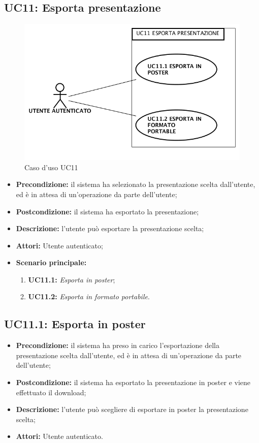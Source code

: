 \subsection{ UC11: Esporta presentazione}

\begin{figure}[h]
	\begin{center}
	\includegraphics[scale=0.4]{diagram/UC11.png}
	\caption{Caso d'uso UC11}
	\end{center}
\end{figure}
\begin{itemize}
	\item \textbf{Precondizione:} il sistema ha selezionato la presentazione scelta dall'utente, ed è in attesa di un'operazione da parte dell'utente;
	\item \textbf{Postcondizione:} il sistema ha esportato la presentazione;
	\item \textbf{Descrizione:} l'utente può esportare la presentazione scelta;
	\item \textbf{Attori:} Utente autenticato;
	\item \textbf{Scenario principale:}
	\begin{enumerate}
		\item \textbf{ UC11.1:} \textit{ Esporta in poster};
		\item \textbf{ UC11.2:} \textit{ Esporta in formato portabile}.
	\end{enumerate}
\end{itemize}
\subsection{ UC11.1: Esporta in poster}

\begin{itemize}
	\item \textbf{Precondizione:} il sistema ha preso in carico l'esportazione della presentazione scelta dall'utente, ed è in attesa di un'operazione da parte dell'utente;
	\item \textbf{Postcondizione:} il sistema ha esportato la presentazione in poster e viene effettuato il download;
	\item \textbf{Descrizione:} l'utente può scegliere di esportare in poster la presentazione scelta;
	\item \textbf{Attori:} Utente autenticato.
\end{itemize}
